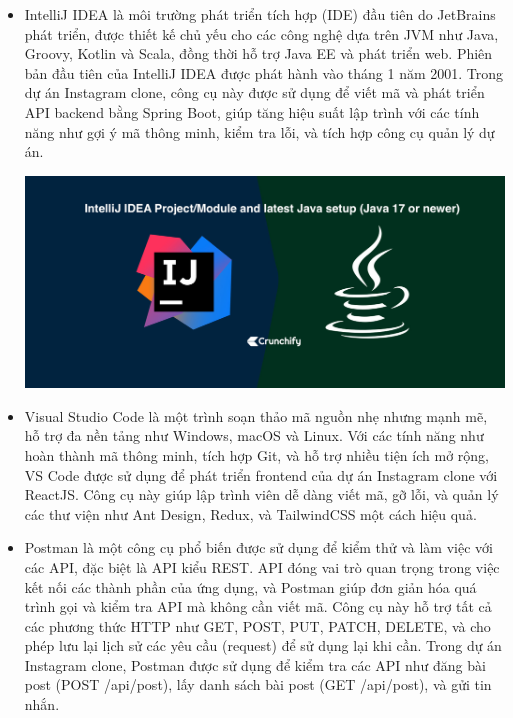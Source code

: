 \begin{itemize}
\item IntelliJ IDEA là môi trường phát triển tích hợp (IDE) đầu tiên do JetBrains phát triển, được thiết kế chủ yếu cho các công nghệ dựa trên JVM như Java, Groovy, Kotlin và Scala, đồng thời hỗ trợ Java EE và phát triển web. Phiên bản đầu tiên của IntelliJ IDEA được phát hành vào tháng 1 năm 2001. Trong dự án Instagram clone, công cụ này được sử dụng để viết mã và phát triển API backend bằng Spring Boot, giúp tăng hiệu suất lập trình với các tính năng như gợi ý mã thông minh, kiểm tra lỗi, và tích hợp công cụ quản lý dự án.

\includegraphics[width=\textwidth]{img/intelij.png}
\end{itemize}


\begin{itemize}
\item Visual Studio Code là một trình soạn thảo mã nguồn nhẹ nhưng mạnh mẽ, hỗ trợ đa nền tảng như Windows, macOS và Linux. Với các tính năng như hoàn thành mã thông minh, tích hợp Git, và hỗ trợ nhiều tiện ích mở rộng, VS Code được sử dụng để phát triển frontend của dự án Instagram clone với ReactJS. Công cụ này giúp lập trình viên dễ dàng viết mã, gỡ lỗi, và quản lý các thư viện như Ant Design, Redux, và TailwindCSS một cách hiệu quả.
\end{itemize}

\begin{itemize}
\item Postman là một công cụ phổ biến được sử dụng để kiểm thử và làm việc với các API, đặc biệt là API kiểu REST. API đóng vai trò quan trọng trong việc kết nối các thành phần của ứng dụng, và Postman giúp đơn giản hóa quá trình gọi và kiểm tra API mà không cần viết mã. Công cụ này hỗ trợ tất cả các phương thức HTTP như GET, POST, PUT, PATCH, DELETE, và cho phép lưu lại lịch sử các yêu cầu (request) để sử dụng lại khi cần. Trong dự án Instagram clone, Postman được sử dụng để kiểm tra các API như đăng bài post (POST /api/post), lấy danh sách bài post (GET /api/post), và gửi tin nhắn.
\end{itemize}

